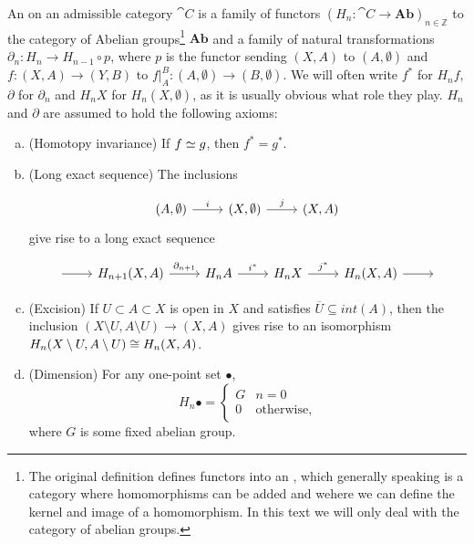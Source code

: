 \begin{definition}
An  on an admissible category $\cat{C}$ is a family of functors $(H_n:\cat{C}\rightarrow \mathbf{Ab})_{n \in\mathbb{Z}}$ to the category of Abelian groups\footnote{The original definition defines functors into an , which generally speaking is a category where homomorphisms can be added and wehere we can define the kernel and image of a homomorphism. In this text we will only deal with the category of abelian groups.} $\mathbf{Ab}$ and a family of natural transformations $\partial_n:H_n\rightarrow H_{n-1}\circ p$, where $p$ is the functor sending $(X,A)$ to $(A,\emptyset)$ and $f:(X,A)\rightarrow (Y,B)$ to $f|_A^B:(A,\emptyset)\rightarrow(B,\emptyset)$. We will often write $f^*$ for $H_n f$, $\partial$ for $\partial_n$ and $H_nX$ for $H_n(X,\emptyset)$, as it is usually obvious what role they play. $H_n$ and $\partial$ are assumed to hold the following axioms:

\begin{enumerate}[(a)]
\item (Homotopy invariance) If $f\simeq g$, then $f^*=g^*$.
\item (Long exact sequence) The inclusions 

\[\begin{tikzcd}
{(A,\emptyset)} \arrow[r, "i"] & {(X,\emptyset)} \arrow[r, "j"] & {(X,A)}
\end{tikzcd}\]
give rise to a long exact sequence

\[\begin{tikzcd}
{} \arrow[r] & {H_{n+1}(X,A)} \arrow[r, "\partial_{n+1}"] & H_nA \arrow[r, "i^*"] & H_nX \arrow[r, "j^*"] & {H_n(X,A)} \arrow[r] & {}
\end{tikzcd}\]

\item (Excision) If $U\subset A\subset X$ is open in $X$ and satisfies $\overline{U}\subseteq int(A)$, then the inclusion $(X\setminus U,A\setminus U)\rightarrow (X,A)$ gives rise to an isomorphism $H_n(X\setminus U,A\setminus U)\cong H_n(X,A)$.
\item (Dimension) For any one-point set $\bullet$, $$H_n\bullet=\begin{cases}G & n=0\\0&\text{otherwise},\end{cases}$$ where $G$ is some fixed abelian group.
\end{enumerate}
\end{definition}

